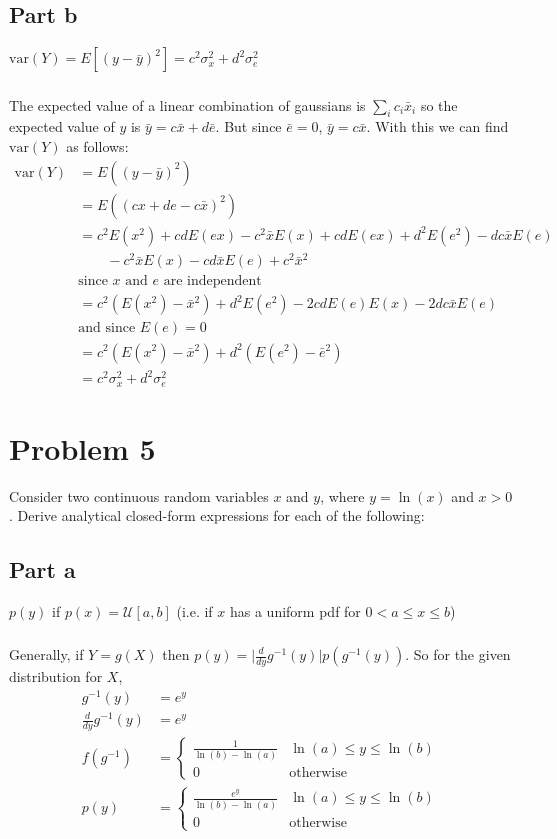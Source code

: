 \documentclass[11pt]{article}
\begin{document}
\subsection*{Part b}
$\text{var}(Y) = E[(y-\bar{y})^2]=c^2\sigma_x^2+d^2\sigma_e^2$

\subparagraph*{}
The expected value of a linear combination of gaussians is $\sum_i c_i\bar{x}_i$ so the expected value of $y$ is $\bar{y}=c\bar{x}+d\bar{e}$. But since $\bar{e}=0$, $\bar{y}=c\bar{x}$. With this we can find $\text{var}(Y)$ as follows:
\begin{align*}
	\text{var}(Y) &= E((y-\bar{y})^2) \\
	&= E((cx+de-c\bar{x})^2) \\
	&= c^2E(x^2)+cdE(ex)-c^2\bar{x}E(x)+cdE(ex)+d^2E(e^2)-dc\bar{x}E(e)\\
	&\qquad -c^2\bar{x}E(x)-cd\bar{x}E(e)+c^2\bar{x}^2 \\
	& \text{since $x$ and $e$ are independent} \\
	&= c^2(E(x^2)-\bar{x}^2)+d^2E(e^2)-2cdE(e)E(x)-2dc\bar{x}E(e)\\
	& \text{and since $E(e)=0$} \\
	&= c^2(E(x^2)-\bar x^2) + d^2(E(e^2) - \bar{e}^2) \\
	&= c^2\sigma_x^2 + d^2\sigma_e^2
\end{align*}

\section*{Problem 5}
Consider two continuous random variables $x$ and $y$, where $y=\ln(x)$ and $x>0$. Derive analytical closed-form expressions for each of the following:

\subsection*{Part a}
$p(y)$ if $p(x) = \mathcal{U}[a,b]$ (i.e. if $x$ has a uniform pdf for $0<a\leq x \leq b$)

\subparagraph*{}
Generally, if $Y=g(X)$ then $p(y)=\Big|\frac{d}{dy}g^{-1}(y)\Big|p(g^{-1}(y))$. So for the given distribution for $X$,
\begin{align*}
	g^{-1}(y) &= e^y \\
	\frac{d}{dy}g^{-1}(y) &= e^y \\
	f(g^{-1}) &= \begin{cases} \frac{1}{\ln(b)-\ln(a)} & \ln(a) \leq y \leq \ln(b) \\ 0 & \text{otherwise} \end{cases} \\
	p(y) &= \begin{cases} \frac{e^y}{\ln(b)-\ln(a)} & \ln(a)\leq y \leq\ln(b) \\ 0 & \text{otherwise} \end{cases}
\end{align*}
\end{document}
